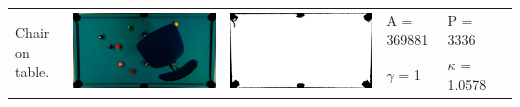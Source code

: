 \begin{tabular}{|l|c|c|l|l|c|}
\multirow{2}{*}{Chair on table.} & \multirow{2}{*}{\includegraphics[scale=0.05]{../images/1/5_img.png}} & \multirow{2}{*}{\includegraphics[scale=0.05]{../images/1/5_mask.png}} & A = 369881 & P = 3336 & \multirow{2}{*}{}\\  
& & & $\gamma$ = 1 & $\kappa$ = 1.0578 & \\
\hline


\end{tabular}
